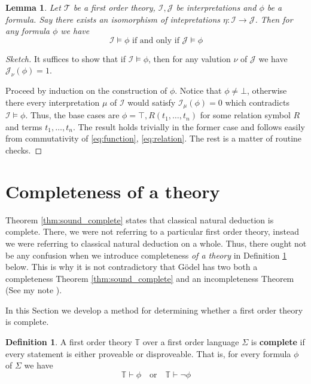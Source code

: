 \documentclass[12pt]{article}
\theoremstyle{plain}
\newtheorem{lemma}[thm]{Lemma}
\theoremstyle{definition}
\newtheorem{defn}[thm]{Definition} %
\newcommand{\bb}[1]{\mathbb{#1}}
\newcommand{\call}[1]{\mathcal{#1}}
\newcommand{\lto}{\longrightarrow}
\begin{document}
	\begin{lemma}\label{lem:isomorphic_models}
		Let $\call{T}$ be a first order theory, $\call{I}, \call{J}$ be interpretations and $\phi$ be a formula. Say there exists an isomorphism of intepretations $\eta: \call{I} \lto \call{J}$. Then for any formula $\phi$ we have
		\begin{equation}
			\call{I} \models \phi \text{ if and only if }\call{J} \models \phi
			\end{equation}
		\end{lemma}
	\begin{proof}[Sketch]
		It suffices to show that if $\call{I} \models \phi$, then for any valution $\nu$ of $\call{J}$ we have $\call{J}_\nu(\phi) = 1$.
		
		Proceed by induction on the construction of $\phi$.  Notice that $\phi \neq \bot$, otherwise there every interpretation $\mu$ of $\call{I}$ would satisfy $\call{I}_\mu(\phi) = 0$ which contradicts $\call{I} \models \phi$. Thus, the base cases are $\phi = \top, R(t_1,\ldots, t_n)$ for some relation symbol $R$ and terms $t_1, \ldots, t_n$. The result holds trivially in the former case and follows easily from commutativity of \eqref{eq:function}, \eqref{eq:relation}. The rest is a matter of routine checks.
		\end{proof}
	
	
	
	\section{Completeness of a theory}
	
	Theorem \ref{thm:sound_complete} states that classical natural deduction is complete. There, we were not referring to a particular first order theory, instead we were referring to classical natural deduction on a whole. Thus, there ought not be any confusion when we introduce completeness \emph{of a theory} in Definition \ref{def:completeness_theory} below. This is why it is not contradictory that G\"{o}del has two both a completeness Theorem \ref{thm:sound_complete} and an incompleteness Theorem (See my note \cite{TroianiIncompleteness}).
	
	In this Section we develop a method for determining whether a first order theory is complete.
	
	\begin{defn}\label{def:completeness_theory}
		A first order theory $\bb{T}$ over a first order language $\Sigma$ is \textbf{complete} if every statement is either proveable or disproveable. That is, for every formula $\phi$ of $\Sigma$ we have
		\begin{equation}
			\bb{T} \vdash \phi \quad \text{or} \quad \bb{T} \vdash \neg \phi
			\end{equation}
		\end{defn}
	
\end{document}
